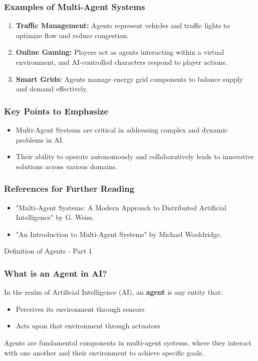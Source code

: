 \documentclass[aspectratio=169]{beamer}
\begin{document}
\begin{frame}[fragile]
    \frametitle{Examples of Multi-Agent Systems}
    \begin{enumerate}
        \item \textbf{Traffic Management:} Agents represent vehicles and traffic lights to optimize flow and reduce congestion.
        \item \textbf{Online Gaming:} Players act as agents interacting within a virtual environment, and AI-controlled characters respond to player actions.
        \item \textbf{Smart Grids:} Agents manage energy grid components to balance supply and demand effectively.
    \end{enumerate}
\end{frame}

\begin{frame}[fragile]
    \frametitle{Key Points to Emphasize}
    \begin{itemize}
        \item Multi-Agent Systems are critical in addressing complex and dynamic problems in AI.
        \item Their ability to operate autonomously and collaboratively leads to innovative solutions across various domains.
    \end{itemize}
\end{frame}

\begin{frame}[fragile]
    \frametitle{References for Further Reading}
    \begin{itemize}
        \item "Multi-Agent Systems: A Modern Approach to Distributed Artificial Intelligence" by G. Weiss.
        \item "An Introduction to Multi-Agent Systems" by Michael Wooldridge.
    \end{itemize}
\end{frame}

\begin{frame}[fragile]{Definition of Agents - Part 1}
    \frametitle{What is an Agent in AI?}
    In the realm of Artificial Intelligence (AI), an \textbf{agent} is any entity that:
    \begin{itemize}
        \item Perceives its environment through sensors
        \item Acts upon that environment through actuators
    \end{itemize}
    Agents are fundamental components in multi-agent systems, where they interact with one another and their environment to achieve specific goals.
\end{frame}
\end{document}

